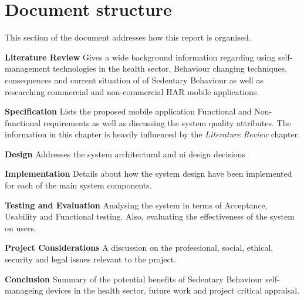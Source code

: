     \section{Document structure}
    This section of the document addresses how this report is organised.\newline
    
    \textbf{Literature Review} Gives a wide background information regarding using self-management technologies in the health sector, Behaviour changing techniques, consequences and current situation of of Sedentary Behaviour as well as researching commercial and non-commercial HAR mobile applications.\newline
    
    
    \textbf{Specification} Lists the proposed mobile application Functional and Non-functional requirements as well as discussing the system quality attributes. The information in this chapter is heavily influenced by the \textit{Literature Review} chapter.\newline
    
    
    \textbf{Design} Addresses the system architectural and \gls{ui} design decisions\newline
    
    
    \textbf{Implementation} Details about how the system design have been implemented for each of the main system components.\newline
    
    
    \textbf{Testing and Evaluation} Analysing the system in terms of Acceptance, Usability and Functional testing. Also, evaluating the effectiveness of the system on users.\newline
    
    \textbf{Project Considerations} A discussion on the professional, social, ethical, security and legal issues relevant to the project.\newline
    
    \textbf{Conclusion} Summary of the potential benefits of Sedentary Behaviour self-manageing devices in the health sector, future work and project critical appraisal.\newline 
